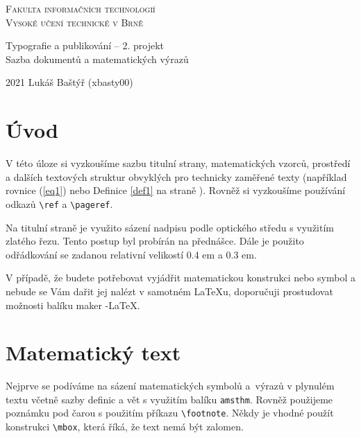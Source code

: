 \documentclass[11pt]{article}
\theoremstyle{definition}
\begin{document}
    \begin{titlepage}
        \begin{center}
            \Huge
            \textsc{Fakulta informačních technologií}\\
            \textsc{Vysoké učení technické v Brně}

            \LARGE
            Typografie a publikování -- 2. projekt \\
            Sazba dokumentů a matematických výrazů \\
        \end{center}
        \Large
        2021 \hfill Lukáš Baštýř (xbasty00)
    \end{titlepage}

    \twocolumn
    \section*{Úvod}
    V této úloze si vyzkoušíme sazbu titulní strany, matematic\-kých vzorců, prostředí a dalších textových struktur obvyklých pro technicky zaměřené texty (například rovnice (\ref{eq1}) nebo Definice \ref{def1} na straně \pageref{def1}). Rovněž si vyzkoušíme používání odkazů \texttt{\textbackslash ref} a \texttt{\textbackslash pageref}.
    
    Na titulní straně je využito sázení nadpisu podle optického středu s využitím zlatého řezu. Tento postup byl probírán na přednášce. Dále je použito odřádkování se zadanou relativní velikostí 0.4 em a 0.3 em.
    
    V případě, že budete potřebovat vyjádřit matematickou konstrukci nebo symbol a nebude se Vám dařit jej nalézt v samotném \LaTeX u, doporučuji prostudovat možnosti balíku maker \AmS-\LaTeX.

    \section{Matematický text}
    Nejprve se podíváme na sázení matematických symbolů a~výrazů v plynulém textu včetně sazby definic a vět s využitím balíku \texttt{amsthm}. Rovněž použijeme poznámku pod čarou s použitím příkazu \texttt{\textbackslash footnote}. Někdy je vhodné použít konstrukci \texttt{\textbackslash mbox\string{\string}}, která říká, že text nemá být zalomen.
    
\end{document}
